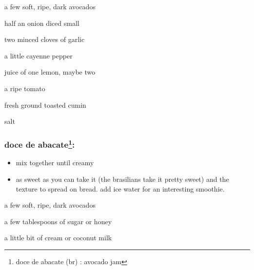 \begin{ingredients}
  \item a few soft, ripe, dark avocados
  \item half an onion diced small
  \item two minced cloves of garlic
  \item a little cayenne pepper
  \item juice of one lemon, maybe two
  \item a ripe tomato
  \item fresh ground toasted cumin
  \item salt
\end{ingredients}

\subsubsection{doce de abacate\footnote{doce de abacate (br) : avocado jam}:}

\begin{itemize}
  \item mix together until creamy
  \item as sweet as you can take it (the brasilians take it pretty sweet) and 
  the texture to spread on bread. add ice water for an interesting smoothie.
\end{itemize}

\begin{ingredients}
  \item a few soft, ripe, dark avocados
  \item a few tablespoons of sugar or honey
  \item a little bit of cream or coconut milk
\end{ingredients}
